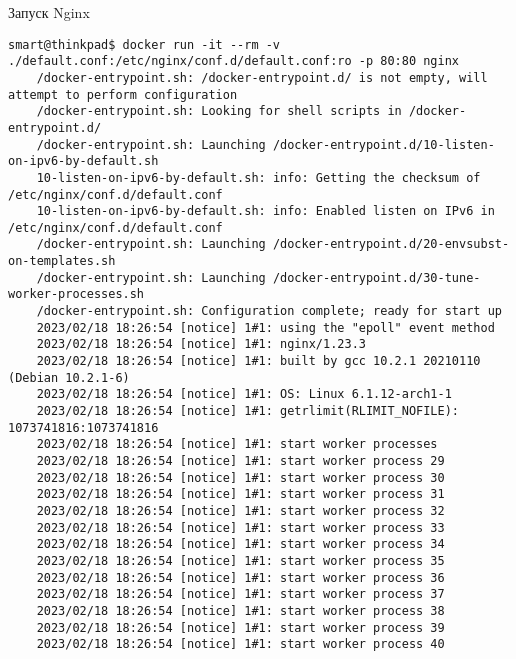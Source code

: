 Запуск Nginx
\begin{Verbatim}[frame=single,breaklines=true,breakanywhere=true]
    smart@thinkpad$ docker run -it --rm -v ./default.conf:/etc/nginx/conf.d/default.conf:ro -p 80:80 nginx
    /docker-entrypoint.sh: /docker-entrypoint.d/ is not empty, will attempt to perform configuration
    /docker-entrypoint.sh: Looking for shell scripts in /docker-entrypoint.d/
    /docker-entrypoint.sh: Launching /docker-entrypoint.d/10-listen-on-ipv6-by-default.sh
    10-listen-on-ipv6-by-default.sh: info: Getting the checksum of /etc/nginx/conf.d/default.conf
    10-listen-on-ipv6-by-default.sh: info: Enabled listen on IPv6 in /etc/nginx/conf.d/default.conf
    /docker-entrypoint.sh: Launching /docker-entrypoint.d/20-envsubst-on-templates.sh
    /docker-entrypoint.sh: Launching /docker-entrypoint.d/30-tune-worker-processes.sh
    /docker-entrypoint.sh: Configuration complete; ready for start up
    2023/02/18 18:26:54 [notice] 1#1: using the "epoll" event method
    2023/02/18 18:26:54 [notice] 1#1: nginx/1.23.3
    2023/02/18 18:26:54 [notice] 1#1: built by gcc 10.2.1 20210110 (Debian 10.2.1-6) 
    2023/02/18 18:26:54 [notice] 1#1: OS: Linux 6.1.12-arch1-1
    2023/02/18 18:26:54 [notice] 1#1: getrlimit(RLIMIT_NOFILE): 1073741816:1073741816
    2023/02/18 18:26:54 [notice] 1#1: start worker processes
    2023/02/18 18:26:54 [notice] 1#1: start worker process 29
    2023/02/18 18:26:54 [notice] 1#1: start worker process 30
    2023/02/18 18:26:54 [notice] 1#1: start worker process 31
    2023/02/18 18:26:54 [notice] 1#1: start worker process 32
    2023/02/18 18:26:54 [notice] 1#1: start worker process 33
    2023/02/18 18:26:54 [notice] 1#1: start worker process 34
    2023/02/18 18:26:54 [notice] 1#1: start worker process 35
    2023/02/18 18:26:54 [notice] 1#1: start worker process 36
    2023/02/18 18:26:54 [notice] 1#1: start worker process 37
    2023/02/18 18:26:54 [notice] 1#1: start worker process 38
    2023/02/18 18:26:54 [notice] 1#1: start worker process 39
    2023/02/18 18:26:54 [notice] 1#1: start worker process 40
\end{Verbatim}

